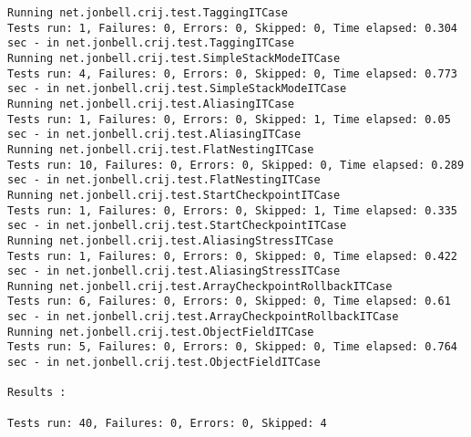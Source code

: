 \documentclass[12pt]{article}
\begin{document}
\begin{scriptsize}
\begin{verbatim}
Running net.jonbell.crij.test.TaggingITCase
Tests run: 1, Failures: 0, Errors: 0, Skipped: 0, Time elapsed: 0.304 sec - in net.jonbell.crij.test.TaggingITCase
Running net.jonbell.crij.test.SimpleStackModeITCase
Tests run: 4, Failures: 0, Errors: 0, Skipped: 0, Time elapsed: 0.773 sec - in net.jonbell.crij.test.SimpleStackModeITCase
Running net.jonbell.crij.test.AliasingITCase
Tests run: 1, Failures: 0, Errors: 0, Skipped: 1, Time elapsed: 0.05 sec - in net.jonbell.crij.test.AliasingITCase
Running net.jonbell.crij.test.FlatNestingITCase
Tests run: 10, Failures: 0, Errors: 0, Skipped: 0, Time elapsed: 0.289 sec - in net.jonbell.crij.test.FlatNestingITCase
Running net.jonbell.crij.test.StartCheckpointITCase
Tests run: 1, Failures: 0, Errors: 0, Skipped: 1, Time elapsed: 0.335 sec - in net.jonbell.crij.test.StartCheckpointITCase
Running net.jonbell.crij.test.AliasingStressITCase
Tests run: 1, Failures: 0, Errors: 0, Skipped: 0, Time elapsed: 0.422 sec - in net.jonbell.crij.test.AliasingStressITCase
Running net.jonbell.crij.test.ArrayCheckpointRollbackITCase
Tests run: 6, Failures: 0, Errors: 0, Skipped: 0, Time elapsed: 0.61 sec - in net.jonbell.crij.test.ArrayCheckpointRollbackITCase
Running net.jonbell.crij.test.ObjectFieldITCase
Tests run: 5, Failures: 0, Errors: 0, Skipped: 0, Time elapsed: 0.764 sec - in net.jonbell.crij.test.ObjectFieldITCase

Results :

Tests run: 40, Failures: 0, Errors: 0, Skipped: 4
\end{verbatim}
\end{scriptsize}
\end{document}
